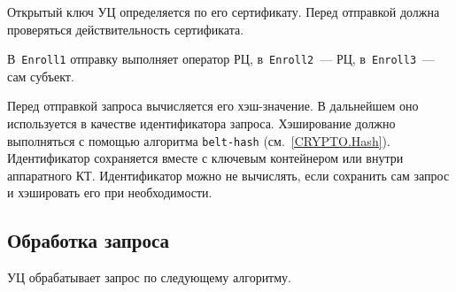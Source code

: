 Открытый ключ УЦ определяется по его сертификату. Перед отправкой 
должна проверяться действительность сертификата.
%

В~\texttt{Enroll1} отправку выполняет оператор РЦ,
в~\texttt{Enroll2}~--- РЦ,
в~\texttt{Enroll3}~--- сам субъект.

Перед отправкой запроса вычисляется его хэш-значение. 
В дальнейшем оно используется в качестве идентификатора запроса. 
Хэширование должно выполняться с помощью алгоритма 
\texttt{belt-hash} (см.~\ref{CRYPTO.Hash}).
%
Идентификатор сохраняется вместе с ключевым контейнером или внутри 
аппаратного КТ.
%
Идентификатор можно не вычислять, если сохранить сам запрос и хэшировать 
его при необходимости.

\subsection{Обработка запроса}\label{PROCESSES.Enroll.Issue}

УЦ обрабатывает запрос по следующему алгоритму.

